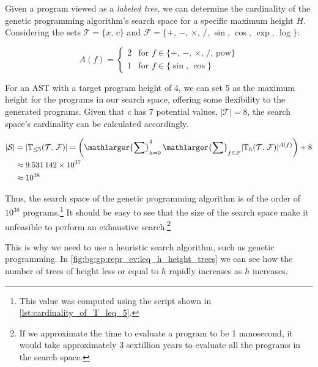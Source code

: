   Given a program viewed as a \emph{labeled tree}, we can determine the 
  cardinality of the genetic programming algorithm's search space for a 
  specific maximum height \(H\). Considering the sets \(\mathcal{T} = \{x,\, 
  c\}\) and \(\mathcal{F} = \{+,\, -,\, \times,\, /,\, \sin,\, \cos,\, \exp,\, 
  \log\}\):

  \[
    A(f) = \begin{cases}
      2 & \text{for } f \in \{+,\, -,\, \times,\, /,\, \mathrm{pow}\} \\
      1 & \text{for } f \in \{\sin,\, \cos\}
    \end{cases}
  \]

  For an AST with a target program height of 4, we can set 5 as the maximum 
  height for the programs in our search space, offering some flexibility to the 
  generated programs. Given that \(c\) has 7 potential values, \(|\mathcal{T}| 
  = 8\), the search space's cardinality can be calculated accordingly.

  \begin{align*}
    |\mathcal{S}| 
      &= |\mathbb{T}_{\leq 5}(\mathcal{T},\, \mathcal{F})| 
        = \left(\mathlarger{\sum}_{h = 0}^{4}\,
          \mathlarger{\sum}_{f \in \mathcal{F}} 
          |\mathbb{T}_{h}(\mathcal{T},\, \mathcal{F})|^{A(f)}
        \right) + 8 \\
      &\approx 9.531\,142 \times 10^{37}  \\
      &\approx 10^{38}
  \end{align*}

  Thus, the search space of the genetic programming algorithm is of the order of
  \(10^{38}\) programs.\footnote{%
    This value was computed using the script shown in 
    \vref{lst:cardinality_of_T_leq_5}.
  }
  It should be easy to see that the size of the search space make it unfeasible
  to perform an exhaustive search.\footnote{If we approximate the time to
  evaluate a program to be 1 nanosecond, it would take approximately 3 sextillion years to evaluate all the programs in the search space.}

  This is why we need to use a heuristic search algorithm, such as genetic
  programming.
  In \vref{fig:bg:gp:repr_ev:leq_h_height_trees} we can see how the number of
  trees of height less or equal to \(h\) rapidly increases as \(h\) increases.

